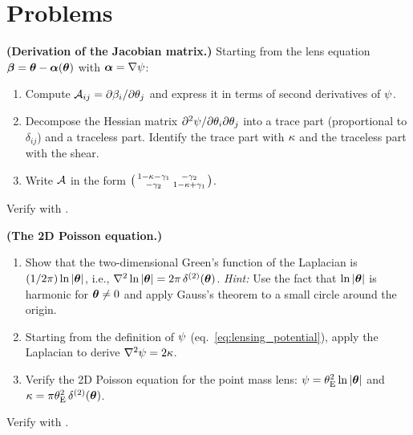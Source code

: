 \section{Problems}
\label{sec:mag_problems}

\begin{exercise}
\label{ex:derive_jacobian}
\textbf{(Derivation of the Jacobian matrix.)}
Starting from the lens equation $\boldsymbol{\beta} = \boldsymbol{\theta} -
\boldsymbol{\alpha}(\boldsymbol{\theta})$ with $\boldsymbol{\alpha} = \nabla\psi$:
\begin{enumerate}[label=(\alph*)]
    \item Compute $\mathcal{A}_{ij} = \partial\beta_i/\partial\theta_j$
          and express it in terms of second derivatives of $\psi$.
    \item Decompose the Hessian matrix $\partial^2\psi/\partial\theta_i
          \partial\theta_j$ into a trace part (proportional to
          $\delta_{ij}$) and a traceless part.  Identify the trace
          part with $\kappa$ and the traceless part with the shear.
    \item Write $\mathcal{A}$ in the form
          $\bigl(\begin{smallmatrix}
          1-\kappa-\gamma_1 & -\gamma_2 \\
          -\gamma_2 & 1-\kappa+\gamma_1
          \end{smallmatrix}\bigr)$.
\end{enumerate}
Verify with
.
\end{exercise}

\begin{exercise}
\label{ex:poisson_2d}
\textbf{(The 2D Poisson equation.)}
\begin{enumerate}[label=(\alph*)]
    \item Show that the two-dimensional Green's function of the
          Laplacian is $(1/2\pi)\ln|\boldsymbol{\theta}|$, i.e.,
          $\nabla^2 \ln|\boldsymbol{\theta}| =
          2\pi\,\delta^{(2)}(\boldsymbol{\theta})$.
          \textit{Hint:} Use the fact that $\ln|\boldsymbol{\theta}|$ is
          harmonic for $\boldsymbol{\theta} \neq 0$ and apply Gauss's theorem
          to a small circle around the origin.
    \item Starting from the definition of $\psi$
          (eq.~\ref{eq:lensing_potential}), apply the Laplacian to
          derive $\nabla^2\psi = 2\kappa$.
    \item Verify the 2D Poisson equation for the point mass lens:
          $\psi = \theta_{\mathrm{E}}^2\ln|\boldsymbol{\theta}|$ and
          $\kappa = \pi\theta_{\mathrm{E}}^2\,\delta^{(2)}(\boldsymbol{\theta})$.
\end{enumerate}
Verify with
.
\end{exercise}


